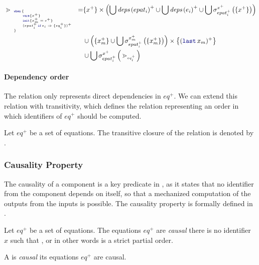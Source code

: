 \begin{equation}
    \begin{split}
        \depRel{\whenTab{x^+}{x_m^+ = c^+}{(\branch{epat_i^+}{e_i}{eq_i^+})^+}}{}{} =
         & \{x^+\} \times \left( \bigcup \deps{epat_i}^+
        \cup \bigcup \deps{e_i}^+
        \cup \bigcup \sigma^{x^+}_{epat_i^+}\left(\{x^+\}\right)\right)         \\
         & \cup \left(\{x_m^+\}
        \cup \bigcup \sigma^{x_m^+}_{epat_i^+}\left(\{x_m^+\}\right)\right)
        \times \left\{(\last{x_m})^+\right\}                                    \\
         & \cup \bigcup \sigma^{x^+}_{epat_i^+}\left(\depRel{eq_i^+}{}{}\right)
    \end{split}
    \label{rule:semantics:grsync:causality:dependencies:rel:eq:when}
\end{equation}

\paragraph{Dependency order}
\label{sec:semantics:grsync:causality:dependencies:depOrd}

The relation  only represents direct dependencies in $eq^+$. We can extend this
relation with transitivity, which defines the relation  representing an order in
which identifiers of $eq^+$ should be computed.

\begin{definition}
    Let $eq^+$ be a set of \GRSync equations.
    The transitive closure of the relation  is denoted by .
\end{definition}

\subsubsection{Causality Property}
\label{sec:semantics:grsync:causality:causal}

The causality of a component is a key predicate in ,
as it states that no identifier from the component depends on itself, so that a mechanized
computation of the outputs from the inputs is possible.
%
The causality property is formally defined in .

\begin{definition}
    \label{def:semantics:grsync:causality:causal:prop}
    Let $eq^+$ be a set of equations. The equations $eq^+$ are \emph{causal} \iff there is no
    identifier $x$ such that , or in other words \iff {} is a
    strict partial order.

    A  is \emph{causal} \iff its equations $eq^+$ are
    causal.
\end{definition}

